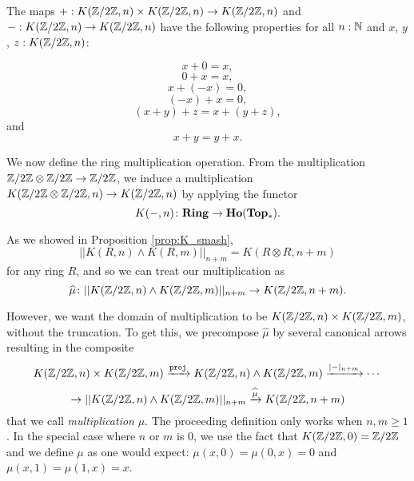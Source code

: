 \documentclass{amsart}
\begin{document}
\begin{proposition}\cite[Prop. 5.1.4]{brunerie:thesis}\label{prop:abeliangpops}
	The maps $ +: K(\mathbb{Z}/2\mathbb{Z},n) \times K(\mathbb{Z}/2\mathbb{Z},n) \to K(\mathbb{Z}/2\mathbb{Z},n) $ and $-: K(\mathbb{Z}/2\mathbb{Z},n)  \to K(\mathbb{Z}/2\mathbb{Z},n) $ have the following properties for all $n:\mathbb{N}$ and $x$, $y$, $z:K(\mathbb{Z}/2\mathbb{Z},n)$:
	
	\[x+0=x,\]
	\[0+x=x,\]
	\[x+(-x)=0,\]
	\[(-x)+x=0,\]
	\[(x+y)+z=x+(y+z),\]
	and
	\[x+y=y+x.\]
	
	\end{proposition}



We now define the ring multiplication operation. From the multiplication
$ \mathbb{Z}/2\mathbb{Z} \otimes \mathbb{Z}/2\mathbb{Z} \to \mathbb{Z}/2\mathbb{Z} $, we induce a multiplication
$ K(\mathbb{Z}/2\mathbb{Z} \otimes \mathbb{Z}/2\mathbb{Z}, n)\to K(\mathbb{Z}/2\mathbb{Z}, n) $ by applying the
functor
\[
K(-,n) \colon \mathbf{Ring} \to \mathbf{Ho}(\mathbf{Top_\ast}).
\]

As we showed in Proposition \ref{prop:K_smash}, 
\[
|| K(R,n) \wedge K(R,m) ||_{n+m} =
K (R \otimes R, n+m )
\]
for any ring $ R $, and so we can treat our multiplication as
\[
\widehat{\mu} \colon
|| K(\mathbb{Z}/2\mathbb{Z},n) \wedge K(\mathbb{Z}/2\mathbb{Z},m) ||_{n+m} \to K(\mathbb{Z}/2\mathbb{Z}, n+m).
\]


However, we want the domain of multiplication
to be $ K ( \mathbb{Z}/2\mathbb{Z} , n) \times K( \mathbb{Z}/2\mathbb{Z}, m) $, without the truncation. To get this, we
precompose $ \widehat{\mu} $ by several canonical arrows
resulting in the composite
\[
K (\mathbb{Z}/2\mathbb{Z} , n) \times K(\mathbb{Z}/2\mathbb{Z}, m)
\xrightarrow{\mathtt{proj}}
K (\mathbb{Z}/2\mathbb{Z} , n) \wedge K(\mathbb{Z}/2\mathbb{Z}, m)
\xrightarrow{|-|_{n+m}}\cdots\]
\[\rightarrow|| K (\mathbb{Z}/2\mathbb{Z} , n) \wedge K(\mathbb{Z}/2\mathbb{Z}, m) ||_{n+m}
\xrightarrow{\widehat{\mu}}
K(\mathbb{Z}/2\mathbb{Z}, n+m)
\]
that we call \emph{multiplication} $ \mu $. The proceeding definition only works when $n,m\geq 1$. In the special case where $n$ or $m$ is 0, we use the fact that $K(\mathbb{Z}/2\mathbb{Z},0)=\mathbb{Z}/2\mathbb{Z}$ and we define $\mu$ as one would expect: $\mu(x,0)=\mu(0,x)=0$ and $\mu(x,1)=\mu(1,x)=x$. 

\end{document}
